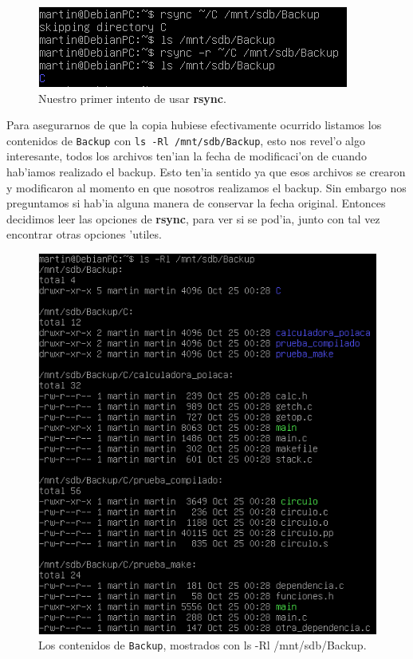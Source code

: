 \documentclass[11pt]{article}
\newcommand{\rsync}[0]{\textbf{rsync}}
\newcommand{\backup}[0]{\texttt{Backup}}
\begin{document}
		\begin{figure}[H]
    			\centering
    			\includegraphics[scale=0.80]{Images/rsync/rsync_backup_first_try.PNG}
    			\caption{Nuestro primer intento de usar \rsync{}.}
    			\label{fig:rsync_backup_first_try}
		\end{figure}

		Para asegurarnos de que la copia hubiese efectivamente ocurrido listamos los contenidos de \backup{} con \texttt{ls -Rl /mnt/sdb/Backup}, esto nos revel'o algo interesante, todos los archivos ten'ian la fecha de modificaci'on de cuando hab'iamos realizado el backup. Esto ten'ia sentido ya que esos archivos se crearon y modificaron al momento en que nosotros realizamos el backup. Sin embargo nos preguntamos si hab'ia alguna manera de conservar la fecha original. Entonces decidimos leer las opciones de \rsync{}, para ver si se pod'ia, junto con tal vez encontrar otras opciones 'utiles.

		\begin{figure}[H]
    			\centering
    			\includegraphics[scale=0.80]{Images/rsync/rsync_backup_contents.PNG}
    			\caption{Los contenidos de \backup{}, mostrados con {ls -Rl /mnt/sdb/Backup}.}
    			\label{fig:rsync_backup_contents}
		\end{figure}
\end{document}
